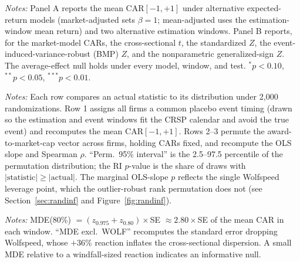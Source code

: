 \documentclass[12pt]{article}
\begin{document}
\begin{table}[htbp]\centering
\begin{threeparttable}
\caption{Robustness to abnormal-return model, estimation window, and test statistic}\label{tab:altmodels}\small

\begin{tablenotes}\small\item \textit{Notes:} Panel A reports the mean CAR$[-1,+1]$ under
alternative expected-return models (market-adjusted sets $\beta=1$; mean-adjusted uses the
estimation-window mean return) and two alternative estimation windows. Panel B reports, for the
market-model CARs, the cross-sectional $t$, the standardized \citet{patell1976} $Z$, the
event-induced-variance-robust \citet{boehmer1991} (BMP) $Z$, and the nonparametric
\citet{cowan1992} generalized-sign $Z$. The average-effect null holds under every model, window,
and test. $^{*}p<0.10$, $^{**}p<0.05$, $^{***}p<0.01$.
\end{tablenotes}
\end{threeparttable}
\end{table}

\begin{table}[htbp]\centering
\begin{threeparttable}
\caption{Design-based (randomization) inference}\label{tab:randinf}\small

\begin{tablenotes}\small\item \textit{Notes:} Each row compares an actual statistic to its
distribution under 2{,}000 randomizations. Row 1 assigns all firms a common placebo event timing
(drawn so the estimation and event windows fit the CRSP calendar and avoid the true event) and
recomputes the mean CAR$[-1,+1]$. Rows 2--3 permute the award-to-market-cap vector across firms,
holding CARs fixed, and recompute the OLS slope and Spearman $\rho$. ``Perm.\ 95\% interval'' is
the 2.5--97.5 percentile of the permutation distribution; the RI $p$-value is the share of draws
with $|\text{statistic}|\geq|\text{actual}|$. The marginal OLS-slope $p$ reflects the single
Wolfspeed leverage point, which the outlier-robust rank permutation does not (see
Section~\ref{sec:randinf} and Figure~\ref{fig:randinf}).
\end{tablenotes}
\end{threeparttable}
\end{table}

\begin{table}[htbp]\centering
\begin{threeparttable}
\caption{Minimum detectable effects at 80\% power}\label{tab:power}\small

\begin{tablenotes}\small\item \textit{Notes:} MDE(80\%) $=(z_{0.975}+z_{0.80})\times$SE
$\approx 2.80\times$SE of the mean CAR in each window. ``MDE excl.\ WOLF'' recomputes the standard
error dropping Wolfspeed, whose $+36\%$ reaction inflates the cross-sectional dispersion. A small
MDE relative to a windfall-sized reaction indicates an informative null.
\end{tablenotes}
\end{threeparttable}
\end{table}
\end{document}
